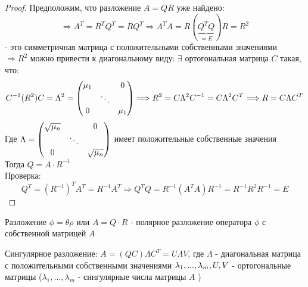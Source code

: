 \begin{proof}
    Предположим, что разложение $A = QR$ уже найдено:
    $$\Longrightarrow A^T = R^TQ^T =RQ^T \Longrightarrow A^TA = R(\underbrace{Q^TQ}_{=E})R = R^2$$ 
    - это симметричная матрица с положительными собственными значениями\\
    $\Longrightarrow R^2$ можно привести к диагональному виду: $\exists$ ортогональная матрица $C$ такая, что:
    $$C^{-1}(R^2)C = \Lambda^2 = \begin{pmatrix}
        \mu_1 & \null & 0\\ \null & \ddots\\ 0 & \null & \mu_1
    \end{pmatrix} \Longrightarrow R^2 = C \Lambda^2C^{-1} = C \Lambda^2 C^T \Longrightarrow R = C \Lambda C^T$$
    Где $\Lambda = \begin{pmatrix}
        \sqrt{\mu_n} & \null & 0\\ \null & \ddots\\ 0 & \null & \sqrt{\mu_n}
    \end{pmatrix}$ имеет положительные собственные значения \\
    Тогда $Q = A \cdot R^{-1}$ \\
    Проверка: 
    $$Q^T = (R^{-1})^TA^T = R^{-1}A^T \Longrightarrow Q^TQ = R^{-1}(A^TA)R^{-1} = R^{-1}R^2R^{-1} = E$$ 
\end{proof}
\begin{definition}
    Разложение $\phi = \theta \rho$  или $A = Q \cdot R$ - полярное разложение оператора $\phi$ с собственной матрицей $A$
\end{definition}
\begin{definition}
    Сингулярное разложение: $A = (QC) \Lambda C^T = U \Lambda V$, где $\Lambda$ - диагональная матрица с положительными собственными значениями $\lambda_1,...,\lambda_m, \\ U,V$ - ортогональные матрицы ($\lambda_1,...,\lambda_m$ - сингулярные числа матрицы $A$ )
\end{definition} 